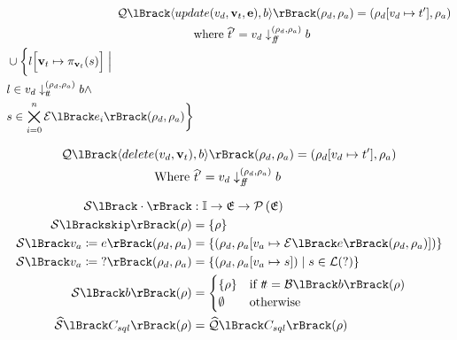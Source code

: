 \begin{align}
    \sqlsem{\langle upd&ate(v_d, \mathbf{v}_t, \mathbf{e}), b \rangle} (\rho_d, \rho_a) = (\rho_d[v_d \mapsto t'], \rho_a) \\
    &\text{where }\abstable' = v_d \downarrow_{\false}^{(\rho_d, \rho_a)} b \\
    \begin{split}
        &\cup \biggl\{ l\Bigl[ \mathbf{v}_t \mapsto \pi_{\mathbf{v}_t}(s) \Bigr] \;\Big|\;\\
        &l \in v_d \downarrow_{\true}^{(\rho_d, \rho_a)} b \land \\
        &s \in \bigtimes_{i = 0}^{n} \expsem{e_i}(\rho_d, \rho_a) \biggr\}
    \end{split}
\end{align}

\begin{align}
    \sqlsem{\langle delete&(v_d, \mathbf{v}_t), b \rangle} (\rho_d, \rho_a) = (\rho_d[v_d \mapsto t'], \rho_a) \\
    &\text{Where }\abstable' = v_d \downarrow_{\false}^{(\rho_d, \rho_a)} b
\end{align}

\begin{align}
    \sem{\cdot} &: \instructions \rightarrow \environments \rightarrow \powerset{\environments} \\
    \sem{\texttt{skip}}(\environment) &= \left\{ \environment \right\} \\
    \sem{v_a \coloneqq e}(\environment_d, \environment_a) &= \left\{(\environment_d, \environment_a[v_a \mapsto \expsem{e}(\environment_d, \environment_a)]) \right\} \\
    \sem{v_a \coloneqq \; ?}(\environment_d, \environment_a) &= \left\{(\environment_d, \environment_a[v_a \mapsto s]) \mid s \in \lang(?) \right\} \\
    \sem{b}(\environment) &= \begin{cases}
        \{\environment\} & \text{if } \true = \boolsem{b}(\environment) \\
        \emptyset & \text{otherwise}
    \end{cases} \\
    \abssem{C_{sql}}(\environment) &= \abssqlsem{C_{sql}}(\environment)
\end{align}
